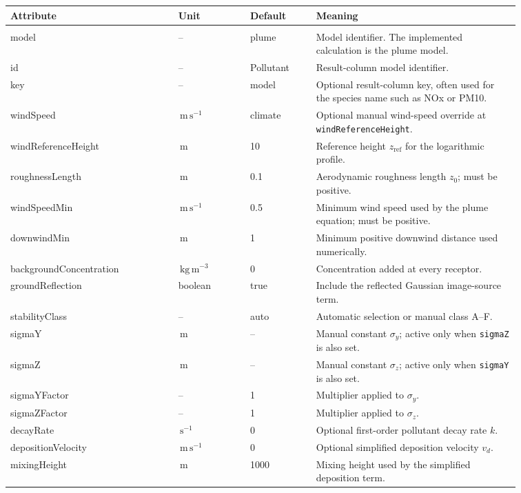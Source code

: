 \documentclass[11pt,a4paper]{article}
\newcommand{\code}[1]{\texttt{#1}}
\newcommand{\unit}[1]{\,\mathrm{#1}}
\newcommand{\NA}{--}
\newcommand{\toprule}{\hline}
\newcommand{\midrule}{\hline}
\begin{document}
\begin{longtable}{>{\ttfamily\raggedright\arraybackslash}p{0.29\linewidth} L{0.12\linewidth} L{0.11\linewidth} L{0.34\linewidth}}
\toprule
\normalfont Attribute & Unit & Default & Meaning \\
\midrule
\endhead
\multicolumn{4}{l}{\textbf{\code{<Pollutant>} attributes}} \\
model & -- & plume & Model identifier. The implemented calculation is the plume model. \\
id & -- & Pollutant & Result-column model identifier. \\
key & -- & model & Optional result-column key, often used for the species name such as NOx or PM10. \\
windSpeed & $\unit{m\,s^{-1}}$ & climate & Optional manual wind-speed override at \code{windReferenceHeight}. \\
windReferenceHeight & $\unit{m}$ & 10 & Reference height $z_{\mathrm{ref}}$ for the logarithmic profile. \\
roughnessLength & $\unit{m}$ & 0.1 & Aerodynamic roughness length $z_0$; must be positive. \\
windSpeedMin & $\unit{m\,s^{-1}}$ & 0.5 & Minimum wind speed used by the plume equation; must be positive. \\
downwindMin & $\unit{m}$ & 1 & Minimum positive downwind distance used numerically. \\
backgroundConcentration & $\unit{kg\,m^{-3}}$ & 0 & Concentration added at every receptor. \\
groundReflection & boolean & true & Include the reflected Gaussian image-source term. \\
stabilityClass & -- & auto & Automatic selection or manual class A--F. \\
sigmaY & $\unit{m}$ & \NA & Manual constant $\sigma_y$; active only when \code{sigmaZ} is also set. \\
sigmaZ & $\unit{m}$ & \NA & Manual constant $\sigma_z$; active only when \code{sigmaY} is also set. \\
sigmaYFactor & -- & 1 & Multiplier applied to $\sigma_y$. \\
sigmaZFactor & -- & 1 & Multiplier applied to $\sigma_z$. \\
decayRate & $\unit{s^{-1}}$ & 0 & Optional first-order pollutant decay rate $k$. \\
depositionVelocity & $\unit{m\,s^{-1}}$ & 0 & Optional simplified deposition velocity $v_d$. \\
mixingHeight & $\unit{m}$ & 1000 & Mixing height used by the simplified deposition term. \\

\end{longtable}
\end{document}
